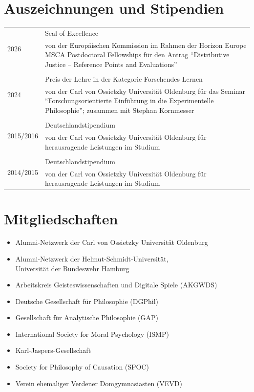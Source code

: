 \documentclass[a4paper,10pt]{article}
\begin{document}
\section{Auszeichnungen und Stipendien}
\begin{longtable}{p{2.5cm}p{11cm}}
\multirow{2}{2.5cm}{\footnotesize{2026}} & Seal of Excellence\\
& \footnotesize{von der Europäischen Kommission im Rahmen der Horizon Europe MSCA Postdoctoral Fellowships für den Antrag \enquote{Distributive Justice -- Reference Points and Evaluations}}\\
\\
\multirow{2}{2.5cm}{\footnotesize{2024}} & Preis der Lehre in der Kategorie Forschendes Lernen\\
& \footnotesize{von der Carl von Ossietzky Universität Oldenburg für das Seminar \enquote{Forschungsorientierte Einführung in die Experimentelle Philosophie}; zusammen mit Stephan Kornmesser}\\
\\
\multirow{2}{2.5cm}{\footnotesize{2015/2016}} & Deutschlandstipendium\\
& \footnotesize{von der Carl von Ossietzky Universität Oldenburg für herausragende Leistungen im Studium}\\
\\
\multirow{2}{2.5cm}{\footnotesize{2014/2015}} & Deutschlandstipendium\\
& \footnotesize{von der Carl von Ossietzky Universität Oldenburg für herausragende Leistungen im Studium}\\
\end{longtable}


\clearpage
\section{Mitgliedschaften}
\begin{itemize}
   \item Alumni-Netzwerk der Carl von Ossietzky Universität Oldenburg
   \item Alumni-Netzwerk der Helmut-Schmidt-Universität,\\Universität der Bundeswehr Hamburg
   \item Arbeitskreis Geisteswissenschaften und Digitale Spiele (AKGWDS)
   \item Deutsche Gesellschaft für Philosophie (DGPhil)
   \item Gesellschaft für Analytische Philosophie (GAP)
   \item International Society for Moral Psychology (ISMP)
   \item Karl-Jaspers-Gesellschaft
   \item Society for Philosophy of Causation (SPOC)
   \item Verein ehemaliger Verdener Domgymnasiasten (VEVD)
\end{itemize}
\end{document}
